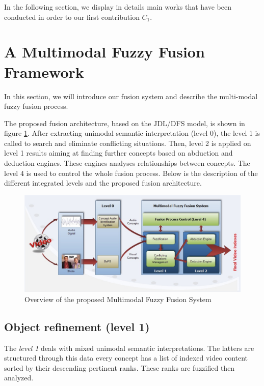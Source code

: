 	In the following section, we display in details main works that have been conducted 
	in order to  our first contribution $C_{1}$.
	
	\section{A Multimodal Fuzzy Fusion Framework}
	\label{c1_1}

	
	In this section, we will introduce our fusion system and
	describe the multi-modal fuzzy fusion process.

	The proposed fusion architecture, based on the JDL/DFS model, is shown in figure \ref{fig:contrib1::fig1}. 
	After extracting unimodal semantic interpretation (level 0), the level 1 
	is called to search and eliminate conflicting situations. Then, level 2 
	is applied on level 1 results aiming at finding further concepts based 
	on abduction and deduction engines. These engines analyses relationships
	between concepts. The level 4 is used to control the whole fusion process. 
	Below is the description of the different integrated levels and the proposed fusion architecture.
	
	\begin{figure}[ht!]	
		\centering
		\includegraphics[width=\textwidth]{graphics/contrib1::fig1}
		\caption{Overview of the proposed Multimodal Fuzzy Fusion System}
		\label{fig:contrib1::fig1}
	\end{figure}

	\subsection{Object refinement (level 1)}
		The \emph{level 1} deals with mixed unimodal semantic interpretations. The latters are structured through 
		this data  every concept has a list of indexed video content sorted by their descending 
		pertinent ranks. These ranks are fuzzified then analyzed.
		
